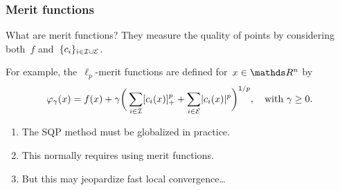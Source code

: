 \documentclass{polyu-presentation}
\newcommand{\con}[1]{c_{#1}}
\newcommand{\ieq}{\mathcal{E}}
\newcommand{\iub}{\mathcal{I}}
\newcommand{\obj}{f}
\begin{document}
\begin{frame}
    \frametitle{Merit functions}

	\begin{block}{What are merit functions?}
        They measure the \alert{quality} of points by considering both~$\obj$ and~$\set{\con{i}}_{i \in \iub \cup \ieq}$.
    \end{block}

    \medskip

    For example, the~\alert{$\ell_p$-merit functions} are defined for~$x \in \R^n$ by
    \begin{equation*}
        \varphi_{\gamma}(x) = \obj(x) + \gamma \bigg( \sum_{i \in \iub} \posp{\con{i}(x)}^p + \sum_{i \in \ieq} \abs{\con{i}(x)}^p \bigg)^{1/p}, \quad \text{with~$\gamma \ge 0$}.
    \end{equation*}

    \begin{block}{}
        \begin{enumerate}[<+(1)->]
            \item The SQP method must be \alert{globalized} in practice.
            \item This normally requires using \alert{merit functions}.
            \item But this may \alert{jeopardize} fast local convergence\dots
        \end{enumerate}
    \end{block}
\end{frame}
\end{document}
